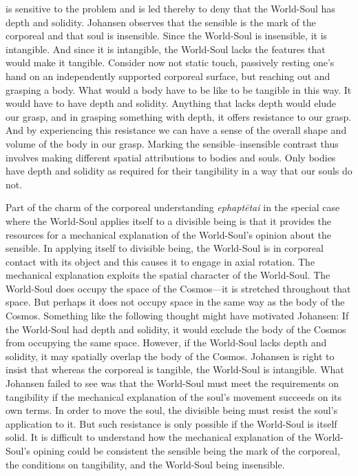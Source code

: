 \citet[140--2]{Johansen:2004dx} is sensitive to the problem and is led thereby to deny that the World-Soul has depth and solidity. Johansen observes that the sensible is the mark of the corporeal and that soul is insensible. Since the World-Soul is insensible, it is intangible. And since it is intangible, the World-Soul lacks the features that would make it tangible. Consider now not static touch, passively resting one's hand on an independently supported corporeal surface, but reaching out and grasping a body. What would a body have to be like to be tangible in this way. It would have to have depth and solidity. Anything that lacks depth would elude our grasp, and in grasping something with depth, it offers resistance to our grasp. And by experiencing this resistance we can have a sense of the overall shape and volume of the body in our grasp. Marking the sensible--insensible contrast thus involves making different spatial attributions to bodies and souls. Only bodies have depth and solidity as required for their tangibility in a way that our souls do not.

Part of the charm of the corporeal understanding \emph{ephaptētai} in the special case where the World-Soul applies itself to a divisible being is that it provides the resources for a mechanical explanation of the World-Soul's opinion about the sensible. In applying itself to divisible being, the World-Soul is in corporeal contact with its object and this causes it to engage in axial rotation. The mechanical explanation exploits the spatial character of the World-Soul. The World-Soul does occupy the space of the Cosmos---it is stretched throughout that space. But perhaps it does not occupy space in the same way as the body of the Cosmos. Something like the following thought might have motivated Johansen: If the World-Soul had depth and solidity, it would exclude the body of the Cosmos from occupying the same space. However, if the World-Soul lacks depth and solidity, it may spatially overlap the body of the Cosmos. Johansen is right to insist that whereas the corporeal is tangible, the World-Soul is intangible. What Johansen failed to see was that the World-Soul must meet the requirements on tangibility if the mechanical explanation of the soul's movement succeeds on its own terms. In order to move the soul, the divisible being must resist the soul's application to it. But such resistance is only possible if the World-Soul is itself solid. It is difficult to understand how the mechanical explanation of the World-Soul's opining could be consistent the sensible being the mark of the corporeal, the conditions on tangibility, and the World-Soul being insensible.

